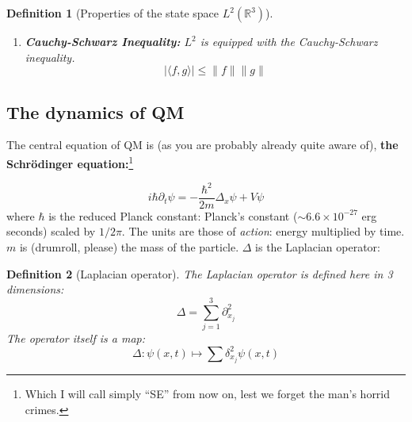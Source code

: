 \documentclass[10pt,a4paper]{report}
\newcommand{\R}{\mathbb{R}}
\newcommand{\C}{\mathbb{C}}
\newtheorem{definition}{Definition}
\begin{document}
\begin{definition}[Properties of the state space $L^2 (\R^3)$]
\begin{enumerate}
\begin{equation}
            \langle f, f \rangle = 0 \iff f = 0
        \end{equation}
        \begin{equation}\label{linearityinarg}
            \langle f, \alpha g_1 + \beta g_2 \rangle = \bar{\alpha}\langle f, g_1\rangle +  \bar{\beta} \langle f, g_2\rangle \quad \text{ and } \quad \langle f, \lambda g \rangle = \bar{\lambda} \langle f, g \rangle \quad  \forall \lambda \in \C
        \end{equation}
        Note that it is linear with respect to both $\R$ and $\C$ in the second argument, and simply linear with respect to $\R$ in the first. Reversing arguments leads to complex conjugacy taking effect:
        \begin{equation}\label{conjugacy}
            \langle f, g \rangle = \overline{\langle g, f \rangle}
        \end{equation}
        \item \textbf{Cauchy-Schwarz Inequality:} $L^2$ is equipped with the Cauchy-Schwarz inequality. 
        \begin{equation}\label{cauchyschwarz}
        | \langle f, g \rangle | \leq \| f \| \| g \|
        \end{equation}
    \end{enumerate}
\end{definition}

\subsection{The dynamics of QM}

The central equation of QM is (as you are probably already quite aware of), \textbf{the Schrödinger equation:}\footnote{Which I will call simply ``SE'' from now on, lest we forget the man's horrid crimes.}

\begin{equation}\label{SE}
    i \hbar \partial_t \psi = - \frac{\hbar ^2}{2m} \Delta_x \psi + V \psi
\end{equation}
where $\hbar$ is the reduced Planck constant: Planck's constant ($\sim 6.6\times 10^{-27}$ erg seconds) scaled by $1/2\pi$. The units are those of \textit{action}: energy multiplied by time. $m$ is (drumroll, please) the mass of the particle. $\Delta$ is the Laplacian operator:

\begin{definition}[Laplacian operator] The Laplacian operator is defined here in 3 dimensions:
    \begin{equation}\label{laplacianeqdef}
        \Delta = \sum_{j=1}^{3} \partial_{x_j}^2
    \end{equation}
The operator itself is a map:
    \begin{equation}\label{laplacian}
        \Delta \colon \psi(x,t) \mapsto \sum \delta_{x_j}^2 \psi (x,t)
    \end{equation}
\end{definition}
\end{document}
